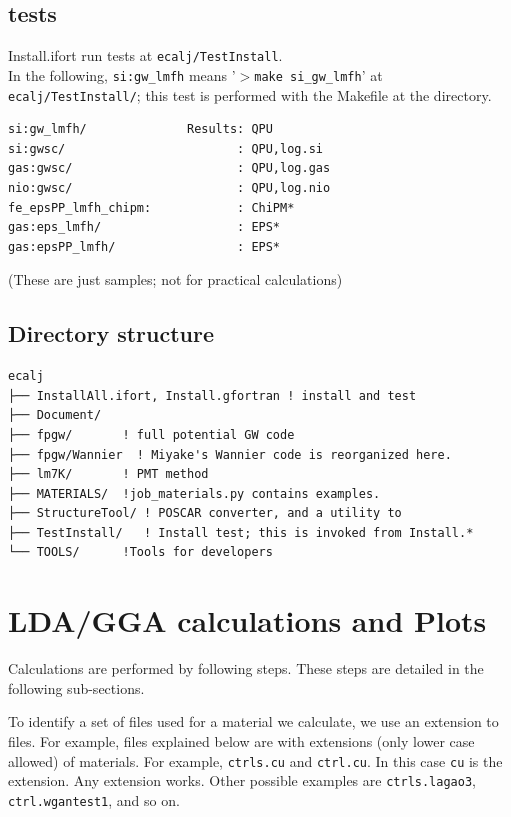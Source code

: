 \documentclass[a4paper,10pt,epsf,fleqn]{article}
\begin{document}
\subsection{tests}
Install.ifort run tests at \verb#ecalj/TestInstall#.\\
In the following, \verb#si:gw_lmfh# means '$>$\verb#make si_gw_lmfh#'
at \verb#ecalj/TestInstall/#; this test is performed with the Makefile
at the directory. 
\begin{verbatim}
si:gw_lmfh/              Results: QPU 
si:gwsc/                        : QPU,log.si
gas:gwsc/                       : QPU,log.gas
nio:gwsc/                       : QPU,log.nio
fe_epsPP_lmfh_chipm:            : ChiPM* 
gas:eps_lmfh/                   : EPS*
gas:epsPP_lmfh/                 : EPS*
\end{verbatim}
(These are just samples; not for practical calculations)

\subsection{Directory structure}
{\baselineskip=1mm
\begin{verbatim}
ecalj
├── InstallAll.ifort, Install.gfortran ! install and test
├── Document/
├── fpgw/       ! full potential GW code
├── fpgw/Wannier  ! Miyake's Wannier code is reorganized here.
├── lm7K/       ! PMT method 
├── MATERIALS/  !job_materials.py contains examples. 
├── StructureTool/ ! POSCAR converter, and a utility to 
├── TestInstall/   ! Install test; this is invoked from Install.*
└── TOOLS/      !Tools for developers
\end{verbatim}
}


\newpage
\section{LDA/GGA calculations and Plots}
\label{ldagga}
Calculations are performed by following steps. 
These steps are detailed in the following sub-sections. 

To identify a set of files used for a material we calculate, we use 
an extension to files. For example, files explained below are
with extensions (only lower case allowed) of materials.
For example, \verb+ctrls.cu+ and \verb+ctrl.cu+. In this case
\verb+cu+ is the extension. Any extension works. Other possible examples are
\verb+ctrls.lagao3+, \verb+ctrl.wgantest1+, and so on.
\end{document}
